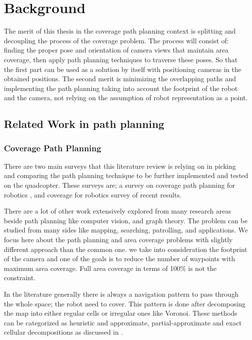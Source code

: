 \chapter{Background} \label{chap:background}


The merit of this thesis in the coverage path planning context is splitting and decoupling the process of the coverage problem. The process will consist of: finding the proper pose and orientation of camera views that maintain area coverage, then apply path planning techniques to traverse these poses. So that the first part can be used as a solution by itself with positioning cameras in the obtained positions. The second merit is minimizing the overlapping paths and implementing the path planning taking into account the footprint of the robot and the camera, not relying on the assumption of robot representation as a point. %

\section{Related Work in path planning}
\subsection{Coverage Path Planning}
There are two main surveys that this literature review is relying on in picking and comparing the path planning technique to be further implemented and tested on the quadcopter. These surveys are; a survey on coverage path planning for robotics \cite{CPP2}, and coverage for robotics survey of recent results\cite{CPP1}.

There are a lot of other work extensively explored from many research areas beside path planning like computer vision, and graph theory. The problem can be studied from many sides like mapping, searching, patrolling, and applications. We focus here about the path planning and area coverage problems with slightly different approach than the common one. we take into consideration the footprint of the camera and one of the goals is to reduce the number of waypoints with maximum area coverage. Full area coverage in terms of 100\% is not the constraint.

In the literature generally there is always a navigation pattern to pass through the whole space; the robot need to cover. This pattern is done after decomposing the map into either regular cells or irregular ones like Voronoi. These methods can be categorized as heuristic and approximate, partial-approximate and exact cellular decompositions as discussed in \cite{CPP1}.

